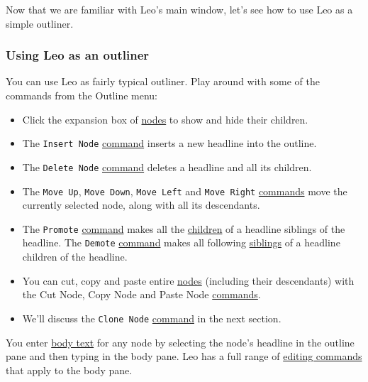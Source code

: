\documentclass[10pt,a4paper,english]{article}
\begin{document}
Now that we are familiar with Leo's main window,
let's see how to use Leo as a simple outliner.



\hypertarget{using-leo-as-an-outliner}{}
\subsubsection*{Using Leo as an outliner}

You can use Leo as fairly typical outliner. Play around with some of the
commands from the Outline menu:
\begin{itemize}
\item {} 
Click the expansion box of \href{glossary.html\#nodes}{nodes} to show and hide their children.

\item {} 
The \texttt{Insert Node} \href{commands.html}{command} inserts a new headline into the outline.

\item {} 
The \texttt{Delete Node} \href{commands.html}{command} deletes a headline and all its children.

\item {} 
The \texttt{Move Up}, \texttt{Move Down}, \texttt{Move Left} and \texttt{Move Right} \href{commands.html}{commands} move the currently selected node,
along with all its descendants.

\item {} 
The \texttt{Promote} \href{commands.html}{command} makes all the \href{glossary.html\#child}{children} of a headline siblings of the headline.
The \texttt{Demote} \href{commands.html}{command} makes all following \href{glossary.html\#siblings}{siblings} of a headline children of the headline.

\item {} 
You can cut, copy and paste entire \href{glossary.html\#nodes}{nodes} (including their descendants) with
the Cut Node, Copy Node and Paste Node \href{commands.html}{commands}.

\item {} 
We'll discuss the \texttt{Clone Node} \href{commands.html}{command} in the next section.

\end{itemize}

You enter \href{glossary.html\#body-text}{body text} for any node by selecting the node's headline in the
outline pane and then typing in the body pane. Leo has a full range of \href{commands.html\#the-edit-menu}{editing
commands} that apply to the body pane.
\end{document}
